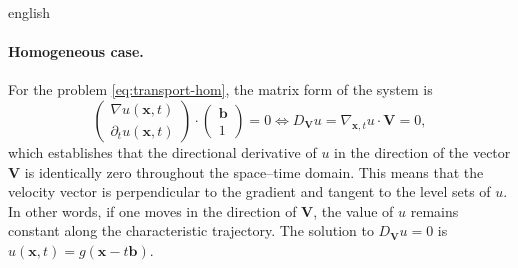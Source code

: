 \documentclass[0000.tex]{subfiles}
\begin{document}
\begin{hyphenrules}{english}
\paragraph{Homogeneous case.}
For the problem \eqref{eq:transport-hom}, the matrix form of the system is
\begin{equation}
  \begin{pmatrix}\nabla u(\mathbf{x},t)\\ \partial_t u(\mathbf{x},t)\end{pmatrix}\cdot
  \begin{pmatrix}\mathbf{b}\\ 1\end{pmatrix}=0
  \iff D_{\mathbf{V}}u=\nabla_{\mathbf{x},t}u\cdot\mathbf{V}=0,
  \label{eq:transport-matrix}
\end{equation}
which establishes that the directional derivative of $u$ in the direction of the vector $\mathbf{V}$ is
identically zero throughout the space--time domain. This means that the velocity vector is perpendicular
to the gradient and tangent to the level sets of $u$. In other words, if one moves in the direction of
$\mathbf{V}$, the value of $u$ remains constant along the characteristic trajectory. The solution to
$D_{\mathbf{V}}u=0$ is $u(\mathbf{x},t)=g(\mathbf{x}-t\mathbf{b})$.


\end{hyphenrules}
\end{document}
